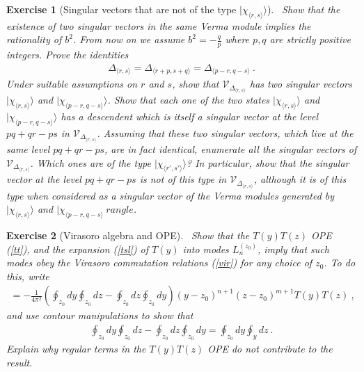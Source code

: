 \documentclass[12pt,a4paper,notitlepage]{report}
\numberwithin{equation}{section}
\theoremstyle{break}
\newtheorem{exo}{Exercise}[chapter]
\begin{document}
\begin{exo}[Singular vectors that are not of the type $|\chi_{\langle r,s \rangle}\rangle$]
 ~\label{exosv}
Show that the existence of two singular vectors in the same Verma module implies the rationality of $b^2$. 
From now on we assume $b^2=-\frac{q}{p}$ where $p,q$ are strictly positive integers. Prove the identities 
\begin{align}
 \Delta_{\langle r,s \rangle}=\Delta_{\langle r+p,s+q \rangle}=\Delta_{\langle p-r,q-s \rangle}\ .
\end{align}
Under suitable assumptions on $r$ and $s$, show that $\mathcal{V}_{\Delta_{\langle r,s \rangle}}$ has two singular vectors $|\chi_{\langle r,s \rangle}\rangle$ and $|\chi_{\langle p-r,q-s \rangle}\rangle$. Show that each one of the two states  $|\chi_{\langle r,s \rangle}\rangle$ and $|\chi_{\langle p-r,q-s \rangle}\rangle$ has a descendent which is itself a singular vector at the level $pq+qr-ps$ in $\mathcal{V}_{\Delta_{\langle r,s \rangle}}$. Assuming that these two singular vectors, which live at the same level $pq+qr-ps$, are in fact identical, enumerate all the singular vectors of $\mathcal{V}_{\Delta_{\langle r,s \rangle}}$. Which ones are of the type $|\chi_{\langle r',s' \rangle}\rangle$? In particular, show that the singular vector at the level $pq+qr-ps$ is not of this type in $\mathcal{V}_{\Delta_{\langle r,s \rangle}}$, although it is of this type when considered as a singular vector of the Verma modules generated by $|\chi_{\langle r,s \rangle}\rangle$ and $|\chi_{\langle p-r,q-s \rangle}\
rangle$.
\end{exo}

\begin{exo}[Virasoro algebra and OPE] 
~\label{exott}
Show that the $T(y)T(z)$ OPE (\ref{tt}), and the expansion (\ref{tsl}) of $T(y)$ into modes $L_n^{(z_0)}$, imply that such modes obey the Virasoro commutation relations (\ref{vir}) for any choice of $z_0$. To do this, write 
\begin{align}
 [L_n^{(z_0)},L_m^{(z_0)}] = -\frac{1}{4\pi^2} \left(\oint_{z_0} dy \oint_{z_0} dz - \oint_{z_0} dz \oint_{z_0} dy\right) (y-z_0)^{n+1}(z-z_0)^{m+1} T(y)T(z)\ ,
\end{align}
and use contour manipulations to show that 
\begin{align}
 \oint_{z_0} dy \oint_{z_0} dz - \oint_{z_0} dz \oint_{z_0} dy = \oint_{z_0} dy \oint_y dz\ .
\end{align}
Explain why regular terms in the $T(y)T(z)$ OPE do not contribute to the result.
\end{exo}
\end{document}

